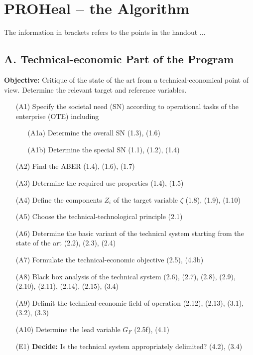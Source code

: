 \documentclass[11pt,a4paper]{article}
\begin{document}
\section{PROHeal -- the Algorithm} 

The information in brackets refers to the points in the handout ...

\subsection*{A. Technical-economic Part of the Program}

\textbf{Objective:} Critique of the state of the art from a
technical-economical point of view. Determine the relevant target and
reference variables.

\begin{itemize}[leftmargin=30pt]
\item[(A1)] Specify the societal need (SN) according to operational tasks
  of the enterprise (OTE) including
  \begin{itemize}[leftmargin=20pt,noitemsep]
  \item[(A1a)] Determine the overall SN (1.3), (1.6) 
  \item[(A1b)] Determine the special SN (1.1), (1.2), (1.4)
  \end{itemize}
\item[(A2)] Find the ABER (1.4), (1.6), (1.7)
\item[(A3)] Determine the required use properties (1.4), (1.5) 
\item[(A4)] Define the components $Z_i$ of the target variable $\zeta$ (1.8),
  (1.9), (1.10)
\item[(A5)] Choose the technical-technological principle (2.1)
\item[(A6)] Determine the basic variant of the technical system starting from
  the state of the art (2.2), (2.3), (2.4)
\item[(A7)] Formulate the technical-economic objective (2.5), (4.3b)
\item[(A8)] Black box analysis of the technical system (2.6), (2.7), (2.8),
  (2.9), (2.10), (2.11), (2.14), (2.15), (3.4)
\item[(A9)] Delimit the technical-economic field of operation (2.12), (2.13),
  (3.1), (3.2), (3.3)
\item[(A10)] Determine the lead variable $G_F$ (2.5f), (4.1)
\item[(E1)] \textbf{Decide:} Is the technical system appropriately delimited?
  (4.2), (3.4)
  \begin{itemize}[leftmargin=20pt,noitemsep]

\end{itemize}
\end{itemize}
\end{document}
